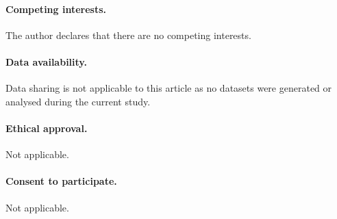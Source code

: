 \documentclass{amsart}
\theoremstyle{plain}
\theoremstyle{remark}
\begin{document}
 \paragraph{Competing interests.}
The author declares that there are no competing interests.

\paragraph{\bf Data availability.}
Data sharing is not applicable to this article as no datasets were generated or analysed during the current study.

\paragraph{\bf Ethical approval.}
Not applicable.

\paragraph{\bf Consent to participate.}
Not applicable.
\end{document}
